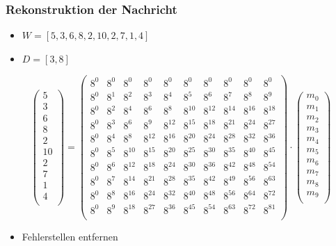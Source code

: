 \documentclass[11pt,aspectratio=169]{beamer}
\begin{document}
	\begin{frame}
		\frametitle{Rekonstruktion der Nachricht}
		
		\begin{itemize}
			
			\item $W = [5,3,6,8,2,10,2,7,1,4]$
			
			\item $D = [3,8]$
			
		\end{itemize}
		
		\[
		\begin{pmatrix}
			5 \\ 3 \\ 6 \\ 8 \\ 2 \\ 10 \\ 2 \\ 7 \\ 1 \\ 4 \\
		\end{pmatrix}
		=
		\begin{pmatrix}
			8^0&    8^0&    8^0&    8^0&    8^0&    8^0&    8^0&    8^0&    8^0&    8^0\\
			8^0&	8^1&	8^2&	8^3&	8^4&	8^5&	8^6&	8^7&    8^8&	8^9\\
			8^0&	8^2&	8^4&	8^6&	8^8& 8^{10}& 8^{12}& 8^{14}& 8^{16}& 8^{18}\\
			8^0&	8^3&	8^6&	8^9& 8^{12}& 8^{15}& 8^{18}& 8^{21}& 8^{24}& 8^{27}\\
			8^0&	8^4&	8^8& 8^{12}& 8^{16}& 8^{20}& 8^{24}& 8^{28}& 8^{32}& 8^{36}\\
			8^0&	8^5& 8^{10}& 8^{15}& 8^{20}& 8^{25}& 8^{30}& 8^{35}& 8^{40}& 8^{45}\\
			8^0&	8^6& 8^{12}& 8^{18}& 8^{24}& 8^{30}& 8^{36}& 8^{42}& 8^{48}& 8^{54}\\
			8^0&	8^7& 8^{14}& 8^{21}& 8^{28}& 8^{35}& 8^{42}& 8^{49}& 8^{56}& 8^{63}\\
			8^0&	8^8& 8^{16}& 8^{24}& 8^{32}& 8^{40}& 8^{48}& 8^{56}& 8^{64}& 8^{72}\\
			8^0&	8^9& 8^{18}& 8^{27}& 8^{36}& 8^{45}& 8^{54}& 8^{63}& 8^{72}& 8^{81}\\
		\end{pmatrix}
		\cdot
		\begin{pmatrix}
			m_0 \\ m_1 \\ m_2 \\ m_3 \\ m_4 \\ m_5 \\ m_6 \\ m_7 \\ m_8 \\ m_9 \\
		\end{pmatrix}
		\]
		
		\begin{itemize}
			\item Fehlerstellen entfernen
		\end{itemize}
		
	\end{frame}	
\end{document}
